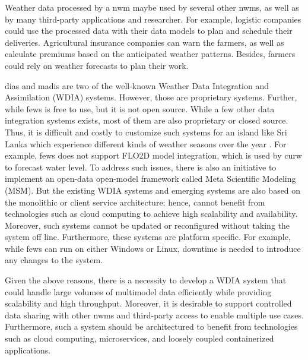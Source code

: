 Weather data processed by a \acrshort{nwm} maybe used by several other \acrshort{nwms}, as well as by many third-party applications and researcher. For example, logistic companies could use the processed data with their data models to plan and schedule their deliveries. Agricultural insurance companies can warn the farmers, as well as calculate premiums based on the anticipated weather patterns. Besides, farmers could rely on weather forecasts to plan their work.

\acrfull{dias} \cite{Kawasaki2018DataReduction} and \acrfull{madis} \cite{Macdermaid2005ArchitectureP2.39} are two of the well-known Weather Data Integration and Assimilation (WDIA) systems. However, those are proprietary systems. Further, while \acrfull{fews} \cite{Werner2013TheSystem} is free to use, but it is not open source. While a few other data integration systems exists, most of them are also proprietary or closed source. Thus, it is difficult and costly to customize such systems for an island like Sri Lanka which experience different kinds of weather seasons over the year \cite{NaveendrakumarFiveLanka}.
For example, \acrshort{fews} does not support FLO2D model integration, which is used by \acrshort{curw} to forecast water level.
To address such issues, there is also an initiative to implement an open-data open-model framework called Meta Scientific Modeling (MSM). 
But the existing WDIA systems and emerging systems are also based on the monolithic or client service architecture; hence, cannot benefit from technologies such as cloud computing to achieve high scalability and availability. Moreover, such systems cannot be updated or reconfigured without taking the system off line. Furthermore, these systems are platform specific. For example, while \acrshort{fews} can run on either Windows or Linux, downtime is needed to introduce any changes to the system. 

Given the above reasons, there is a necessity to develop a WDIA system that could handle large volumes of multimodel data efficiently while providing scalability and high throughput. Moreover, it is desirable to support controlled data sharing with other \acrshort{nwms} and third-party access to enable multiple use cases. Furthermore, such a system should be architectured to benefit from technologies such as cloud computing, microservices, and loosely coupled containerized applications.
